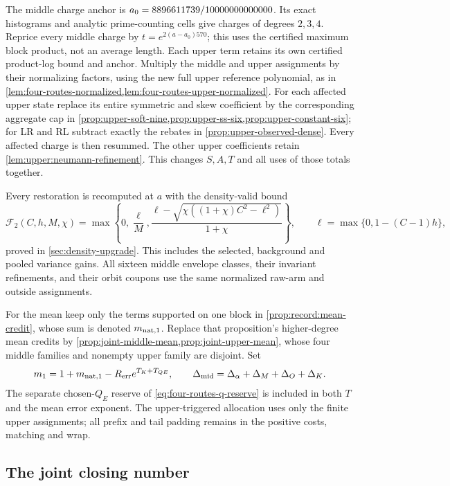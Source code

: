 The middle charge anchor is $a_0=8896611739/10000000000000$. Its exact
histograms and analytic prime-counting cells give charges of degrees
$2,3,4$. Reprice every middle charge by
$t=e^{2(a-a_0)570}$; this uses the certified maximum block product,
not an average length. Each upper term retains its own certified
product-log bound and anchor. Multiply the middle and upper
assignments by their normalizing factors, using the new full upper
reference polynomial, as in
\cref{lem:four-routes-normalized,lem:four-routes-upper-normalized}.
For each affected upper state replace its entire symmetric and skew
coefficient by the corresponding aggregate cap in
\cref{prop:upper-soft-nine,prop:upper-ss-six,prop:upper-constant-six};
for LR and RL subtract exactly the rebates in
\cref{prop:upper-observed-dense}. Every affected charge is then
resummed. The other upper coefficients retain
\cref{lem:upper:neumann-refinement}. This changes $S,A,T$ and all
uses of those totals together.

Every restoration is recomputed at $a$ with the density-valid bound
\begin{equation}\label{eq:four-routes-restoration}
 \mathcal F_2(C,h,M,\chi)=
 \max\left\{0,\frac{\ell}{M},
 \frac{\ell-\sqrt{\chi((1+\chi)C^2-\ell^2)}}{1+\chi}\right\},
 \qquad \ell=\max\{0,1-(C-1)h\},
\end{equation}
proved in \cref{sec:density-upgrade}. This includes the selected,
background and pooled variance gains. All sixteen middle envelope
classes, their invariant refinements, and their orbit coupons use
the same normalized raw-arm and outside assignments.

For the mean keep only the terms supported on one block in
\cref{prop:record:mean-credit}, whose sum is denoted $m_{\rm nat,1}$.
Replace that proposition's higher-degree mean credits by
\cref{prop:joint-middle-mean,prop:joint-upper-mean}, whose four
middle families and nonempty upper family are disjoint. Set
\[
 m_1=1+m_{\rm nat,1}-R_{\rm err}e^{T_K+T_{QE}},\qquad
 \Delta_{\rm mid}=\Delta_\alpha+\Delta_M+\Delta_O+\Delta_K.
\]
The separate chosen-$Q_E$ reserve of
\eqref{eq:four-routes-q-reserve} is included in both $T$ and the mean
error exponent. The upper-triggered allocation uses only the finite
upper assignments; all prefix and tail padding remains in the positive
costs, matching and wrap.

\subsection{The joint closing number}

